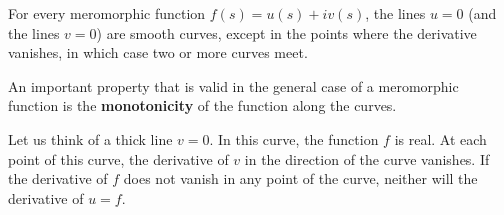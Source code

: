 \documentclass[a4paper]{amsart}
\numberwithin{equation}{section}
\begin{document}
\begin{large}
For every meromorphic function $f(s)=u(s) + i v(s)$, the lines $u=0$ (and
the lines $v=0$) are smooth curves, except in the points where the derivative
vanishes, in which case two or more curves meet.

An important property that is valid in the general case of a meromorphic
function is the {\bf monotonicity} of the function along the curves.

Let us think of a thick line $v=0$. In this curve, the function $f$
is real. At each point of this curve, the derivative of $v$ in the 
direction of
the curve vanishes. If the derivative of $f$ does not vanish in any point of
the curve, neither will the derivative of $u=f$.

\end{large}


\begin{figure}

\end{figure}
\end{document}
